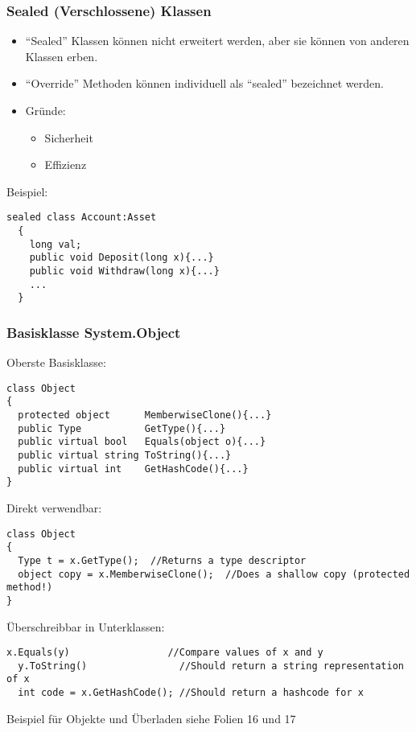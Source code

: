 \subsubsection{Sealed (Verschlossene) Klassen}
\begin{itemize}
  \item "`Sealed"' Klassen können nicht erweitert werden, aber sie können von
  anderen Klassen erben. 
  \item "`Override"' Methoden können individuell als "`sealed"' bezeichnet
  werden.
  \item Gründe:
  \begin{itemize}
    \item Sicherheit
    \item Effizienz
  \end{itemize}
\end{itemize}
Beispiel: 
\begin{lstlisting}[style=Csharp]
  sealed class Account:Asset
  {
    long val; 
    public void Deposit(long x){...}
    public void Withdraw(long x){...}
    ...
  }
\end{lstlisting}

\subsubsection{Basisklasse System.Object}
Oberste Basisklasse:
\begin{lstlisting}[style=Csharp]
class Object
{
  protected object      MemberwiseClone(){...}
  public Type           GetType(){...}
  public virtual bool   Equals(object o){...}
  public virtual string ToString(){...}
  public virtual int    GetHashCode(){...}
}
\end{lstlisting}
Direkt verwendbar: 
\begin{lstlisting}[style=Csharp]
class Object
{
  Type t = x.GetType();  //Returns a type descriptor
  object copy = x.MemberwiseClone();  //Does a shallow copy (protected method!)
}
\end{lstlisting}
Überschreibbar in Unterklassen: 
\begin{lstlisting}[style=Csharp]
  x.Equals(y)                 //Compare values of x and y
  y.ToString()                //Should return a string representation of x
  int code = x.GetHashCode(); //Should return a hashcode for x
\end{lstlisting}

Beispiel für Objekte und Überladen siehe Folien 16 und 17
